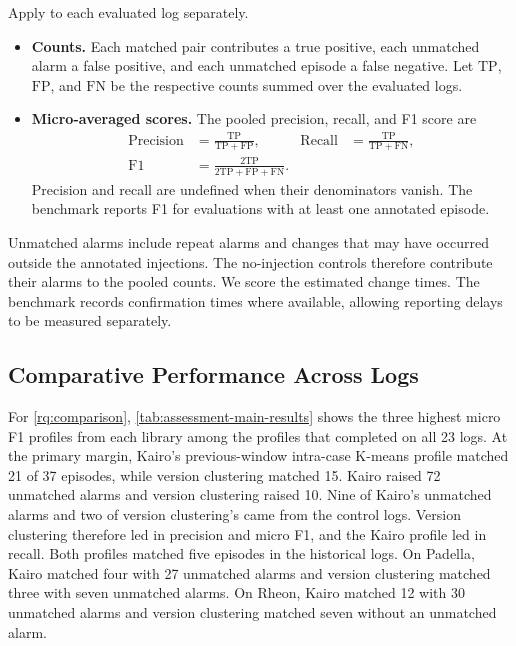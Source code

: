 \begin{Definition}\label{def:assessment-scores}
Apply  to each evaluated log separately.
\begin{itemize}
  \item \textbf{Counts.} Each matched pair contributes a true positive, each unmatched alarm a false positive, and each unmatched episode a false negative. Let $\mathrm{TP}$, $\mathrm{FP}$, and $\mathrm{FN}$ be the respective counts summed over the evaluated logs.
  \item \textbf{Micro-averaged scores.} The pooled precision, recall, and F1 score are
  \[
  \begin{aligned}
    \text{Precision}&=\frac{\mathrm{TP}}{\mathrm{TP}+\mathrm{FP}},
    &\text{Recall}&=\frac{\mathrm{TP}}{\mathrm{TP}+\mathrm{FN}},\\
    \text{F1}&=\frac{2\mathrm{TP}}{2\mathrm{TP}+\mathrm{FP}+\mathrm{FN}} .
  \end{aligned}
  \]
  Precision and recall are undefined when their denominators vanish. The benchmark reports F1 for evaluations with at least one annotated episode.
\end{itemize}
\end{Definition}

Unmatched alarms include repeat alarms and changes that may have occurred outside the annotated injections. The no-injection controls therefore contribute their alarms to the pooled counts. We score the estimated change times. The benchmark records confirmation times where available, allowing reporting delays to be measured separately.

\subsection{Comparative Performance Across Logs}
\label{sec:assessment-results}

For \ref*{rq:comparison}, \autoref{tab:assessment-main-results} shows the three highest micro F1 profiles from each library among the profiles that completed on all 23 logs. At the primary margin, Kairo's previous-window intra-case K-means profile matched 21 of 37 episodes, while \softwarepm{} version clustering matched 15. Kairo raised 72 unmatched alarms and version clustering raised 10. Nine of Kairo's unmatched alarms and two of version clustering's came from the control logs. Version clustering therefore led in precision and micro F1, and the Kairo profile led in recall. Both profiles matched five episodes in the historical logs. On Padella, Kairo matched four with 27 unmatched alarms and version clustering matched three with seven unmatched alarms. On Rheon, Kairo matched 12 with 30 unmatched alarms and version clustering matched seven without an unmatched alarm.


